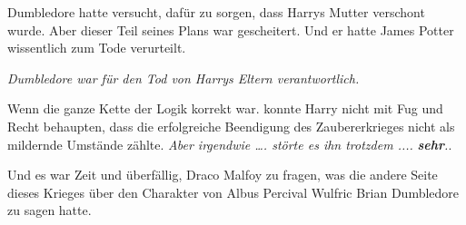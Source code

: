 Dumbledore hatte versucht, dafür zu sorgen, dass Harrys Mutter verschont wurde.
Aber dieser Teil seines Plans war gescheitert. Und er hatte James Potter
wissentlich zum Tode verurteilt.

\emph{Dumbledore war für den Tod von Harrys Eltern verantwortlich.}

Wenn die ganze Kette der Logik korrekt war. konnte Harry nicht mit Fug und Recht
behaupten, dass die erfolgreiche Beendigung des Zaubererkrieges nicht als
mildernde Umstände zählte.  \emph{ Aber
irgendwie …. störte es ihn trotzdem ....} \textbf{\emph{sehr}}\emph{.}\grqq{}.

Und es war Zeit und überfällig, Draco Malfoy zu fragen, was die andere Seite
dieses Krieges über den Charakter von Albus Percival Wulfric Brian Dumbledore zu
sagen hatte.

